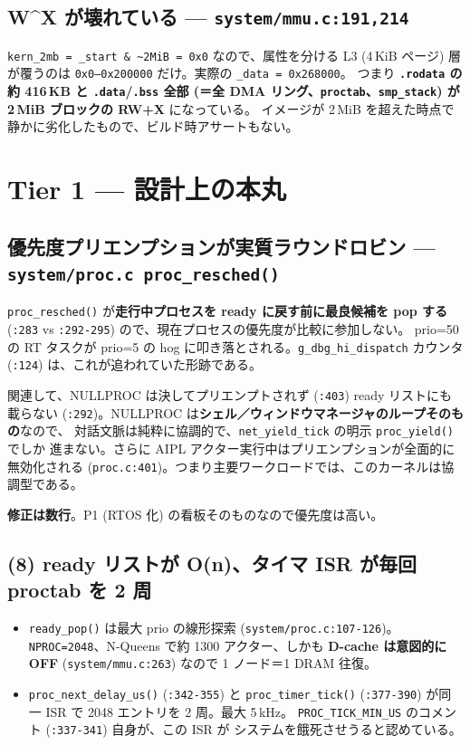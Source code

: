 \documentclass[a4paper,11pt]{ltjsarticle}
\newcommand{\finding}[2]{\subsection{#1 --- \texttt{#2}}}
\begin{document}
\finding{W\textasciicircum X が壊れている}{system/mmu.c:191,214}

\texttt{kern\_2mb = \_start \& \textasciitilde 2MiB = 0x0} なので、属性を分ける L3
(4\,KiB ページ) 層が覆うのは \texttt{0x0--0x200000} だけ。実際の \texttt{\_data = 0x268000}。
つまり\textbf{ \texttt{.rodata} の約 416\,KB と \texttt{.data}/\texttt{.bss} 全部 (＝全 DMA
リング、\texttt{proctab}、\texttt{smp\_stack}) が 2\,MiB ブロックの RW+X} になっている。
イメージが 2\,MiB を超えた時点で静かに劣化したもので、ビルド時アサートもない。

\section{Tier 1 --- 設計上の本丸}

\finding{優先度プリエンプションが実質ラウンドロビン}{system/proc.c proc\_resched()}

\texttt{proc\_resched()} が\textbf{走行中プロセスを ready に戻す前に最良候補を pop する}
(\texttt{:283} vs \texttt{:292-295}) ので、現在プロセスの優先度が比較に参加しない。
prio=50 の RT タスクが prio=5 の hog に叩き落とされる。\texttt{g\_dbg\_hi\_dispatch}
カウンタ (\texttt{:124}) は、これが追われていた形跡である。

関連して、NULLPROC は決してプリエンプトされず (\texttt{:403}) ready リストにも載らない
(\texttt{:292})。NULLPROC は\textbf{シェル／ウィンドウマネージャのループそのもの}なので、
対話文脈は純粋に協調的で、\texttt{net\_yield\_tick} の明示 \texttt{proc\_yield()} でしか
進まない。さらに AIPL アクター実行中はプリエンプションが全面的に無効化される
(\texttt{proc.c:401})。つまり主要ワークロードでは、このカーネルは協調型である。

\textbf{修正は数行}。P1 (RTOS 化) の看板そのものなので優先度は高い。

\subsection{(8) ready リストが O(n)、タイマ ISR が毎回 proctab を 2 周}

\begin{itemize}[leftmargin=1.4em,itemsep=2pt]
\item \texttt{ready\_pop()} は最大 prio の線形探索 (\texttt{system/proc.c:107-126})。
      \texttt{NPROC=2048}、N-Queens で約 1300 アクター、しかも\textbf{ D-cache は意図的に
      OFF} (\texttt{system/mmu.c:263}) なので 1 ノード＝1 DRAM 往復。
\item \texttt{proc\_next\_delay\_us()} (\texttt{:342-355}) と \texttt{proc\_timer\_tick()}
      (\texttt{:377-390}) が同一 ISR で 2048 エントリを 2 周。最大 5\,kHz。
      \texttt{PROC\_TICK\_MIN\_US} のコメント (\texttt{:337-341}) 自身が、この ISR が
      システムを餓死させうると認めている。
\end{itemize}
\end{document}
